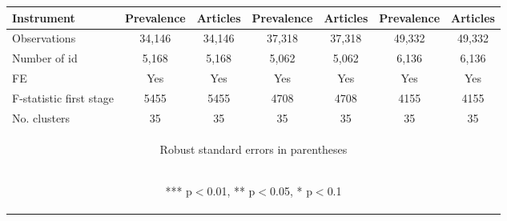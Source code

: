 \documentclass{article}
\begin{document}
\begin{table}[htbp]
{\begin{tabular}{lcccccc}
\vspace{4pt} Instrument & Prevalence & Articles & Prevalence & Articles & Prevalence & Articles \\ \hline
Observations & 34,146 & 34,146 & 37,318 & 37,318 & 49,332 & 49,332 \\
Number of id & 5,168 & 5,168 & 5,062 & 5,062 & 6,136 & 6,136 \\
FE & Yes & Yes & Yes & Yes & Yes & Yes \\
F-statistic first stage & 5455 & 5455 & 4708 & 4708 & 4155 & 4155 \\
No. clusters & 35 & 35 & 35 & 35 & 35 & 35 \\ \hline
\multicolumn{7}{c}{\begin{footnotesize} Robust standard errors in parentheses\end{footnotesize}} \\
\multicolumn{7}{c}{\begin{footnotesize} *** p$<$0.01, ** p$<$0.05, * p$<$0.1\end{footnotesize}} \\
\end{tabular}
}
\end{table}
\end{document}
